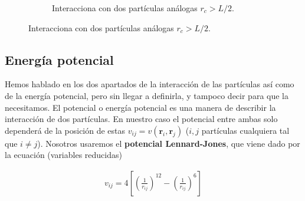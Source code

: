 \documentclass[11pt]{article}
\newcommand{\rn}{\mathbf{r}}
\newcommand{\parentesis}[1]{\left( #1  \right)}
\newcommand{\ccorchetes}[1]{\left[ #1  \right]}
\begin{document}
\begin{figure}[h!]
\begin{subfigure}{0.45\linewidth}
	\caption{Interacciona con dos partículas análogas $r_c>L/2$.}
	\end{subfigure}
\end{figure}


\subsection{Energía potencial}

Hemos hablado en los dos apartados de la interacción de las partículas así como de la energía potencial, pero sin llegar a definirla, y tampoco decir para que la necesitamos. El potencial o energía potencial es una manera de describir la interacción de dos partículas. En nuestro caso el potencial entre ambas solo dependerá de la posición de estas $v_{ij} = v(\rn_i,\rn_j)$ ($i,j$ partículas cualquiera tal que $i\neq j$). Nosotros usaremos el \textbf{potencial Lennard-Jones}, que viene dado por la ecuación (variables reducidas)

\begin{eqnarray}
	v_{ij} = 4 \ccorchetes{\parentesis{\frac{1}{r_{ij}}}^{12}-\parentesis{\frac{1}{r_{ij}}}^6}
\end{eqnarray}
\end{document}
